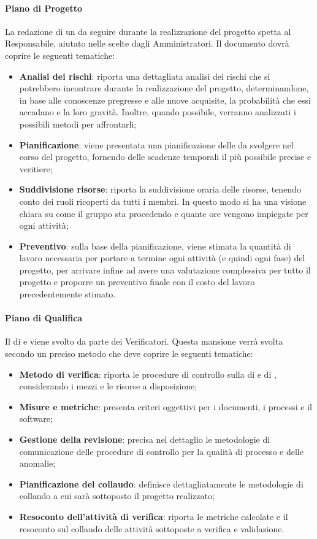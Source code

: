 \paragraph{Piano di Progetto}\Spazio
La redazione di un  da seguire durante la realizzazione del progetto spetta al Responsabile, aiutato nelle scelte dagli Amministratori. Il documento dovrà coprire le seguenti tematiche:
 \begin{itemize}
 	\item\textbf{{Analisi dei rischi}}: riporta una dettagliata analisi dei rischi che si potrebbero incontrare durante la realizzazione del progetto, determinandone, in base alle conoscenze pregresse e alle nuove acquisite, la probabilità che essi accadano e la loro gravità. Inoltre, quando possibile, verranno analizzati i possibili metodi per affrontarli;
 	\item\textbf{{Pianificazione}}: viene presentata una pianificazione delle  da svolgere nel corso del progetto, fornendo delle scadenze temporali il più possibile precise e veritiere;
 	\item {\textbf{Suddivisione risorse}: riporta la suddivisione oraria delle risorse, tenendo conto dei ruoli ricoperti da tutti i membri. In questo modo si ha una visione chiara su come il gruppo sta procedendo e quante ore vengono impiegate per ogni attività;}
 	\item\textbf{{Preventivo}}: sulla base della pianificazione, viene stimata la quantità di lavoro necessaria per portare a termine ogni attività (e quindi ogni fase) del progetto, per arrivare infine ad avere una valutazione complessiva per tutto il progetto e proporre un preventivo finale con il costo del lavoro precedentemente stimato.
 \end{itemize}
\paragraph{Piano di Qualifica}\Spazio
Il  di  e  viene svolto da parte dei Verificatori. Questa mansione verrà svolta secondo un preciso metodo che deve coprire le seguenti tematiche:
\begin{itemize}
	\item\textbf{{Metodo di verifica}}: riporta le procedure di controllo sulla  di  e di , considerando i mezzi e le risorse a disposizione;
	\item\textbf{{Misure e metriche}}: presenta criteri oggettivi per i documenti, i processi e il software;
	\item\textbf{{Gestione della revisione}}: precisa nel dettaglio le metodologie di comunicazione delle procedure di controllo per la qualità di processo e delle anomalie;
	\item\textbf{{Pianificazione del collaudo}}: definisce dettagliatamente le metodologie di collaudo a cui sarà sottoposto il progetto realizzato;
	\item\textbf{{Resoconto dell'attività di verifica}}: riporta le metriche calcolate e il resoconto sul collaudo delle attività sottoposte a verifica e validazione.
\end{itemize}
